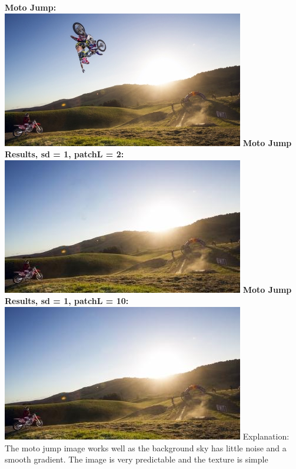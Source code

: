 \documentclass[]{article}
\begin{document}
\textbf{Moto Jump:}\\
	\includegraphics{moto2.jpg}
	\label{fig:moto2}
\textbf{Moto Jump Results, sd = 1, patchL = 2:}\\
	\includegraphics{moto2_results_patch2.jpg}
	\label{fig:moto2_results}
	\textbf{Moto Jump Results, sd = 1, patchL = 10:}\\
	\includegraphics{moto2_results_patch10.jpg}
	\label{fig:moto2_results}
Explanation: The moto jump image works well as the background sky has little noise and a smooth gradient. The image is very predictable and the texture is simple
\pagebreak
\end{document}
